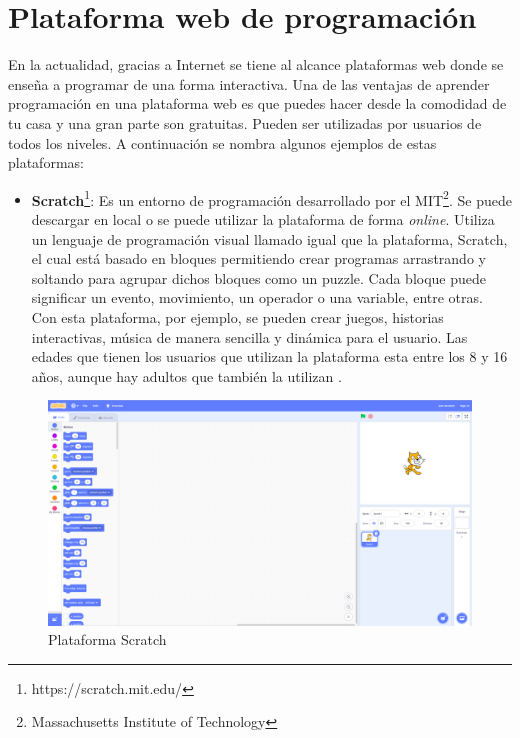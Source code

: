 \section{Plataforma web de programación}
En la actualidad, gracias a Internet se tiene al alcance plataformas web donde se enseña a programar de una forma interactiva. Una de las ventajas de aprender programación en una plataforma web es que puedes hacer desde la comodidad de tu casa y una gran parte son gratuitas. Pueden ser utilizadas por usuarios de todos los niveles. A continuación se nombra algunos ejemplos de estas plataformas:\\
\newpage
\begin{itemize}
\item \textbf{Scratch}\footnote{https://scratch.mit.edu/}: Es un entorno de programación desarrollado por el MIT\footnote{Massachusetts Institute of Technology}. Se puede descargar en local o se puede utilizar la plataforma de forma \textit{online}. Utiliza  un lenguaje de programación visual llamado igual que la plataforma, Scratch, el cual está basado en bloques permitiendo crear programas arrastrando y soltando para agrupar dichos bloques como un puzzle. Cada bloque puede significar un evento, movimiento, un operador o una variable, entre otras. Con esta plataforma, por ejemplo,  se pueden crear juegos, historias interactivas, música de manera sencilla y dinámica para el usuario. Las edades que tienen los usuarios que utilizan la plataforma esta entre los 8 y 16 años, aunque hay adultos que también la utilizan \cite{scratch}.
\end{itemize}

\begin{figure}[H]
    \centering
    \includegraphics[width=12cm, keepaspectratio]{img/scratch.png}
    \caption{Plataforma Scratch}
    \label{fig:scrach}
\end{figure}

